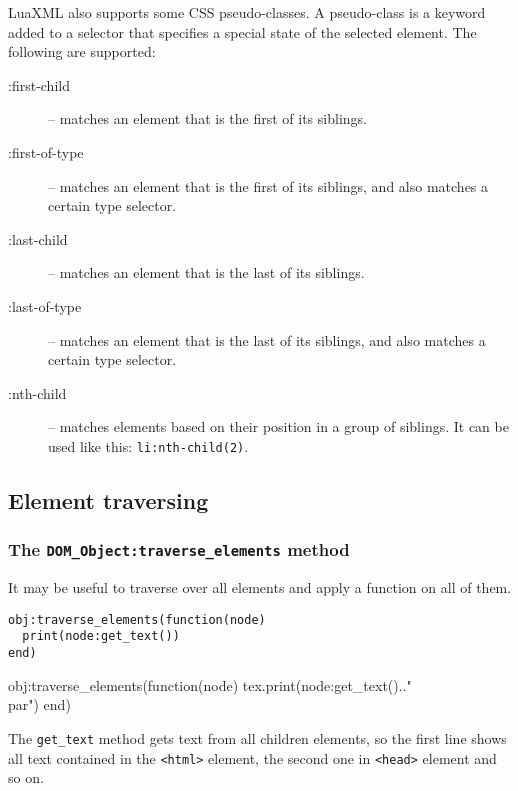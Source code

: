 \documentclass{ltxdoc}
\begin{document}
\bigskip
\noindent LuaXML also supports some CSS pseudo-classes. A pseudo-class is a
keyword added to a selector that specifies a special state of the selected
element. The following are supported:

\begin{description}
  \item[:first-child] -- matches an element that is the first of its siblings.
  \item[:first-of-type] -- matches an element that is the first of its siblings, 
    and also matches a certain type selector.
  \item[:last-child] -- matches an element that is the last of its siblings.
  \item[:last-of-type] -- matches an element that is the last of its siblings,
    and also matches a certain type selector.
  \item[:nth-child] -- matches elements based on their position in a group of siblings.
    It can be used like this: \verb|li:nth-child(2)|.
\end{description}




\subsection{Element traversing}

\subsubsection{The \texttt{DOM\_Object:traverse\_elements} method}

It may be useful to traverse over all elements and apply a function on all of them. 

\begin{verbatim}
obj:traverse_elements(function(node)
  print(node:get_text())
end)
\end{verbatim}

\begin{framed}
  \begin{luacode*}
obj:traverse_elements(function(node)
  tex.print(node:get_text().."\\par")
end)
  \end{luacode*}
\end{framed}

The \verb|get_text| method gets text from all children elements, so the first
line shows all text contained in the \verb|<html>| element, the second one in
\verb|<head>| element and so on.  
\end{document}
